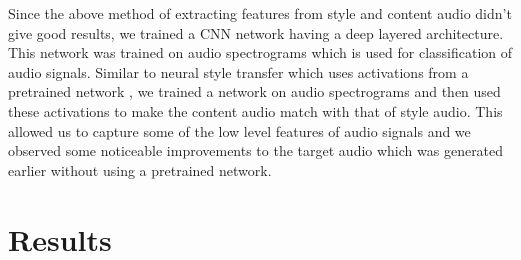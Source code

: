 \documentclass[10pt,twocolumn,letterpaper]{article}
\begin{document}
Since the above method of extracting features from style and content audio didn't give good results, we trained a CNN network having a deep layered architecture. This network was trained on audio spectrograms which is used for classification of audio signals. Similar to neural style transfer which uses activations from a pretrained network , we trained a network on audio spectrograms and then used these activations to make the content audio match with that of style audio. This allowed us to capture some of the low level features of audio signals and we observed some noticeable improvements to the target audio which was generated earlier without using a pretrained network.




\section{Results}
\end{document}
